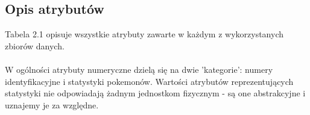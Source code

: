 \documentclass[12pt, a4paper]{report}
\renewcommand{\figurename}{Rys}
\begin{document}
\subsection{Opis atrybutów}
Tabela 2.1 opisuje wszystkie atrybuty zawarte w każdym z wykorzystanych zbiorów danych.\\\\ \noindent
W ogólności atrybuty numeryczne dzielą się na dwie 'kategorie': numery identyfikacyjne i statystyki pokemonów. Wartości atrybutów reprezentujących statystyki nie odpowiadają żadnym jednostkom fizycznym - są one abstrakcyjne i uznajemy je za względne.\\

\renewcommand{\figurename}{Tabela.}
\end{document}
